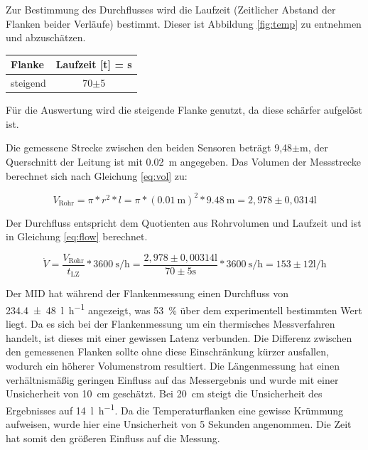 Zur Bestimmung des Durchflusses wird  die Laufzeit (Zeitlicher Abstand der Flanken beider Verläufe) bestimmt. Dieser ist Abbildung \ref{fig:temp} zu entnehmen und abzuschätzen.

\begin{center}
	\begin{tabular}{lc}
		\label{tab:}
		
		\textbf{Flanke} & \textbf{Laufzeit} [t] = s\\
		\hline
		steigend & 70$\pm$5 
	\end{tabular}
\end{center}

Für die Auswertung wird die steigende Flanke genutzt, da diese schärfer aufgelöst ist.

Die gemessene Strecke zwischen den beiden Sensoren beträgt 9,48$\pm$\si{\meter}, der Querschnitt der Leitung ist mit \SI{0,02}{\meter} angegeben. Das Volumen der Messstrecke berechnet sich nach Gleichung \ref{eq:vol} zu:

\begin{equation}
	\label{eq:vol}
	V_{\text{Rohr}} = \pi * r^2 * l = \pi * (\SI{0,01}{\meter})^2 * \SI{9,48}{\meter} = 2,978\pm0,0314\si{\litre}
\end{equation}

Der Durchfluss entspricht dem Quotienten aus Rohrvolumen und Laufzeit und ist in Gleichung \ref{eq:flow} berechnet.

\begin{equation}
	\label{eq:flow}
	\dot V = \frac{V_{\text{Rohr}}}{t_{\text{LZ}}}*\SI{3600}{\second\per\hour} = \frac{2,978\pm0,00314\si{\litre}}{70\pm5\si{\second}}*\SI{3600}{\second\per\hour} = 153\pm12\si{\litre\per\hour}
\end{equation}

Der MID hat während der Flankenmessung einen Durchfluss von \SI{234,4(48)}{\litre\per\hour} angezeigt, was \SI{53}{\percent} über dem experimentell bestimmten Wert liegt. Da es sich bei der Flankenmessung um ein thermisches Messverfahren handelt, ist dieses mit einer gewissen Latenz verbunden. Die Differenz zwischen den gemessenen Flanken sollte ohne diese Einschränkung kürzer ausfallen, wodurch ein höherer Volumenstrom resultiert. Die Längenmessung hat einen verhältnismäßig geringen Einfluss auf das Messergebnis und wurde mit einer Unsicherheit von \SI{10}{\centi\meter} geschätzt. Bei \SI{20}{\centi\meter} steigt die Unsicherheit des Ergebnisses auf \SI{14}{\litre\per\hour}. Da die Temperaturflanken eine gewisse Krümmung aufweisen, wurde hier eine Unsicherheit von 5 Sekunden angenommen. Die Zeit hat somit den größeren Einfluss auf die Messung. 


